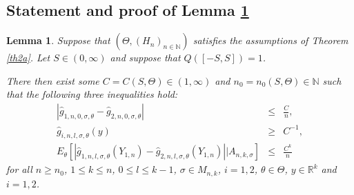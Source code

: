 \documentclass[number,citesort,seceqn,dvips]{arxbj}
\newtheorem{lemma}{Lemma}[section]
\newcommand{\RR}{\mathbb{R}}
\newcommand{\NN}{\mathbb{N}}
\begin{document}
\subsection{\texorpdfstring{Statement and proof of Lemma \protect\ref{Lemexpectbound}}
{Statement and proof of Lemma 5.1}}\label{SUBSEClemma51}
%
\begin{lemma}\label{Lemexpectbound}
Suppose that $(\Theta,(H_n)_{n\in
\NN})$ satisfies the assumptions of Theorem \ref{th2a}.
Let $S\in(0,\infty)$ and suppose that $Q([-S,S])=1$.

There then exist some $C=C(S,\Theta)\in(1,\infty)$ and
$n_0=n_0(S,\Theta)\in\NN$ such that the following three inequalities
hold:
%
\begin{eqnarray} \label{hatg0diff}
|\hat
g_{1,n,0,\sigma,\theta}-\hat
g_{2,n,0,\sigma,\theta}|&\le& \frac Cn,\\\label{awayfromzero}
\hat g_{i,n,l,\sigma,\theta}(y)&\ge&C^{-1},\\\label{hatcondEgdiff}
E_\theta [ |\hat g_{1,n,l,\sigma,\theta}(Y_{1,n})- \hat
g_{2,n,l,\sigma,\theta}(Y_{1,n})|  | A_{n,k,\sigma} ] &\le&
\frac{C^k}n
\end{eqnarray}
%
for all $n \ge  n_0$, $1 \le  k \le  n$, $0 \le  l\le
k - 1$, $\sigma\in M_{n,k}$, $i=1,2$, $\theta\in\Theta$, $y\in
\RR^k$\vadjust{\goodbreak}
and $i=1,2$.
\end{lemma}
%
\end{document}
